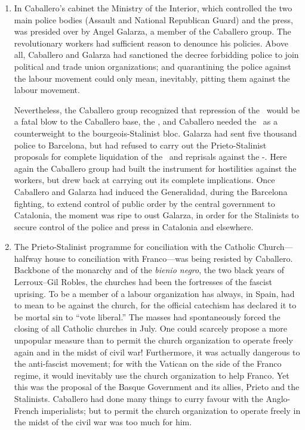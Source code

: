 \begin{enumerate}
  \item In Caballero’s cabinet the Ministry of the Interior, which controlled the two main police bodies (Assault and National Republican Guard) and the press, was presided over by Angel Galarza, a member of the Caballero group. The revolutionary workers had sufficient reason to denounce his policies. Above all, Caballero and Galarza had sanctioned the decree forbidding police to join political and trade union organizations; and quarantining the police against the labour movement could only mean, inevitably, pitting them against the labour movement.
  
  Nevertheless, the Caballero group recognized that repression of the \CNT\ would be a fatal blow to the Caballero base, the \UGT, and Caballero needed the \CNT\ as a counterweight to the bourgeois-Stalinist bloc. Galarza had sent five thousand police to Barcelona, but had refused to carry out the Prieto-Stalinist proposals for complete liquidation of the \POUM\ and reprisals against the \FAI-\CNT. Here again the Caballero group had built the instrument for hostilities against the workers, but drew back at carrying out its complete implications. Once Caballero and Galarza had induced the Generalidad, during the Barcelona fighting, to extend control of public order by the central government to Catalonia, the moment was ripe to oust Galarza, in order for the Stalinists to secure control of the police and press in Catalonia and elsewhere.
  
  \item The Prieto-Stalinist programme for conciliation with the Cath\-ol\-ic Church---halfway house to conciliation with Franco---was being resisted by Caballero. Backbone of the monarchy and of the \emph{bienio negro}, the two black years of Lerroux--Gil Robles, the churches had been the fortresses of the fascist uprising. To be a member of a labour organization has always, in Spain, had to mean to be against the church, for the official catechism has declared it to be mortal sin to ``vote liberal.'' The masses had spontaneously forced the closing of all Catholic churches in July. One could scarcely propose a more unpopular measure than to permit the church organization to operate freely again and in the midst of civil war! Furthermore, it was actually dangerous to the anti-fascist movement; for with the Vatican on the side of the Franco regime, it would inevitably use the church organization to help Franco. Yet this was the proposal of the Basque Government and its allies, Prieto and the Stalinists. Caballero had done many things to curry favour with the Anglo-French imperialists; but to permit the church organization to operate freely in the midst of the civil war was too much for him.
\end{enumerate}

